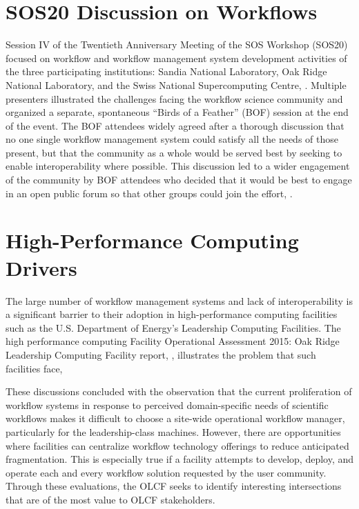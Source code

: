 \section{SOS20 Discussion on
Workflows}\label{sos20-discussion-on-workflows}

Session IV of the Twentieth Anniversary Meeting of the SOS Workshop
(SOS20) focused on workflow and workflow management
system development activities of the three participating institutions: Sandia
National Laboratory, Oak Ridge National Laboratory, and the Swiss National Supercomputing Centre, \cite{pack_sos20_2016}. Multiple
presenters illustrated the challenges facing the workflow science community and
organized a separate, spontaneous ``Birds of a Feather'' (BOF) session at
the end of the event. The BOF attendees widely agreed after a thorough
discussion that no one single workflow management system could satisfy
all the needs of those present, but that the community as a whole would
be served best by seeking to enable interoperability where possible. This
discussion led to a wider engagement of the community by BOF attendees
who decided that it would be best to engage in an open public forum so that
other groups could join the effort, \cite{billings_[science-iwg]_2016}.

\section{High-Performance Computing
Drivers}\label{high-performance-computing-drivers}

The large number of workflow management systems and lack of
interoperability is a significant barrier to their adoption in
high-performance computing facilities such as the U.S. Department of Energy's
Leadership Computing Facilities. The high performance computing Facility
Operational Assessment 2015: Oak Ridge Leadership Computing Facility
report, \cite{barker_scientific_2007}, illustrates the problem that such facilities
face,

\begin{displayquote}
These discussions concluded with the observation that the current proliferation
of workflow systems in response to perceived domain-specific needs of 
scientific workflows makes it difficult to choose a site-wide operational
workflow manager, particularly for the leadership-class machines. However,
there are opportunities where facilities can centralize workflow technology 
offerings to reduce anticipated fragmentation. This is especially true if a 
facility attempts to develop, deploy, and operate each and every workflow 
solution requested by the user community. Through these evaluations, the OLCF
seeks to identify interesting intersections that are of the most value to OLCF
stakeholders.
\end{displayquote}

